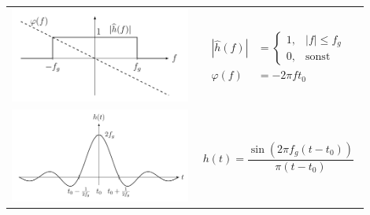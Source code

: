 \begin{tabular}[c]{@{}p{0.5\linewidth}p{0.4\linewidth}@{}}
    \begin{minipage}[top]{\linewidth}
        \includegraphics*[width=\linewidth]{img/7.3.1_TP_f.png}
    \end{minipage}
     &
    \begin{minipage}[top]{\linewidth}
        {
            \begin{align*}
                |\hat{h}(f)| & =
                \begin{cases}
                    1, & |f|\leq f_g  \\
                    0, & \text{sonst}
                \end{cases}           \\
                \varphi(f)   & = -2\pi ft_0
            \end{align*}
        }
    \end{minipage}
    \\
    \begin{minipage}[top]{\linewidth}
        \includegraphics*[width=\linewidth]{../img/7.3.1_TP_t.png}
    \end{minipage}
     &
    \begin{minipage}[top]{\linewidth}
        \begin{equation*}
            h(t) = \frac{\sin(2\pi f_g(t-t_0))}{\pi (t-t_0)}
        \end{equation*}
    \end{minipage}
\end{tabular}

